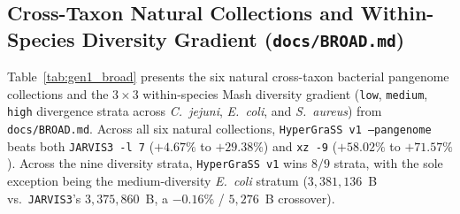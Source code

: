 \documentclass[10pt]{article}
\theoremstyle{definition}
\begin{document}
\subsection{Cross-Taxon Natural Collections and Within-Species Diversity Gradient (\texttt{docs/BROAD.md})}

Table~\ref{tab:gen1_broad} presents the six natural cross-taxon bacterial pangenome collections and the $3\times 3$ within-species Mash diversity gradient (\texttt{low}, \texttt{medium}, \texttt{high} divergence strata across \textit{C.~jejuni}, \textit{E.~coli}, and \textit{S.~aureus}) from \texttt{docs/BROAD.md}. Across all six natural collections, \texttt{HyperGraSS v1 --pangenome} beats both \texttt{JARVIS3 -l 7} ($+4.67\%$ to $+29.38\%$) and \texttt{xz -9} ($+58.02\%$ to $+71.57\%$). Across the nine diversity strata, \texttt{HyperGraSS v1} wins $8/9$ strata, with the sole exception being the medium-diversity \textit{E.~coli} stratum ($3,381,136$~B vs.\ \texttt{JARVIS3}'s $3,375,860$~B, a $-0.16\%$ / $5,276$~B crossover).
\end{document}
